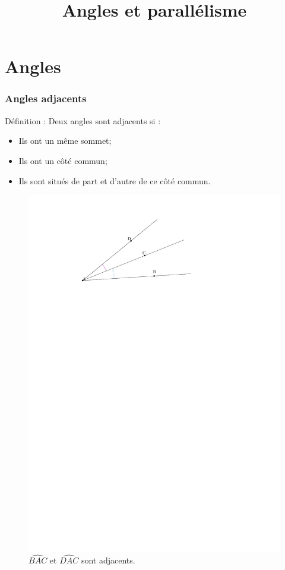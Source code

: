\documentclass{beamer}
\title{Angles et parallélisme}
\begin{document}
\frame{\titlepage}

\section{Angles}


\frame{\tableofcontents[sectionstyle=show/shaded, subsectionstyle=show/shaded]}

\begin{frame}
  \frametitle{Angles adjacents}

  \begin{alertblock}{Définition :}	
    Deux angles sont adjacents si :
    \begin{itemize}
    \item Ils ont un même sommet;
    \item Ils ont un côté commun;
    \item Ils sont situés de part et d'autre de ce côté commun.
    \end{itemize}
  \end{alertblock}

  \begin{figure}[H]
    \centering
    \includegraphics[width=0.4\linewidth]{5x10-angles/sources/adjacents.pdf}
    \\$\widehat{BAC}$ et $\widehat{DAC}$ sont adjacents.
  \end{figure}

\end{frame}
\end{document}
